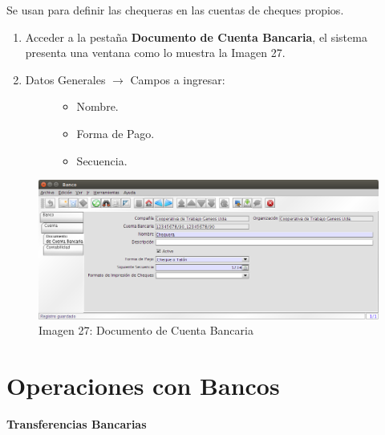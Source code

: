 \documentclass[letterpaper,10pt,spanish]{sphinxmanual}
\begin{document}
Se usan para definir las chequeras en las cuentas de cheques propios.
\begin{enumerate}
\item {} 
Acceder a la pestaña \textbf{Documento de Cuenta Bancaria}, el sistema presenta una ventana como lo muestra la Imagen 27.

\item {} \begin{description}
\item[{Datos Generales \(\rightarrow\) Campos a ingresar:}] \leavevmode\begin{itemize}
\item {} 
Nombre.

\item {} 
Forma de Pago.

\item {} 
Secuencia.

\end{itemize}

\end{description}

\end{enumerate}
\begin{figure}[htbp]
\centering
\capstart

\includegraphics{ly_bancos_27.png}
\caption{Imagen 27: Documento de Cuenta Bancaria}\end{figure}


\section{Operaciones con Bancos}
\label{finanzas:operaciones-con-bancos}
\textbf{Transferencias Bancarias}
\end{document}
